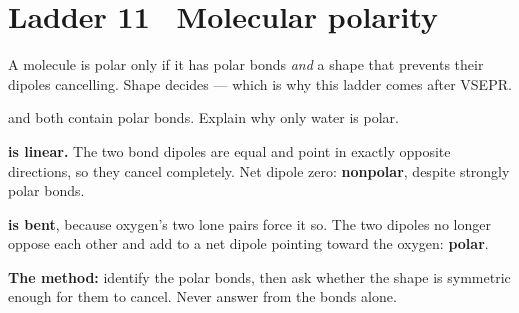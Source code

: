 \documentclass{apchem-worksheet}
\begin{document}
\section*{\sffamily Ladder 11 \textbullet\ Molecular polarity}
 

A molecule is polar only if it has polar bonds \emph{and} a shape that
prevents their dipoles cancelling. Shape decides --- which is why this
ladder comes after VSEPR.

\begin{workedexample}
 and  both contain polar bonds. Explain why only water is
polar.

\textbf{ is linear.} The two  bond dipoles are equal and
point in exactly opposite directions, so they cancel completely. Net
dipole zero: \textbf{nonpolar}, despite strongly polar bonds.

\textbf{ is bent}, because oxygen's two lone pairs force it so.
The two  dipoles no longer oppose each other and add to a net
dipole pointing toward the oxygen: \textbf{polar}.

\textbf{The method:} identify the polar bonds, then ask whether the shape
is symmetric enough for them to cancel. Never answer from the bonds alone.
\end{workedexample}
\end{document}
